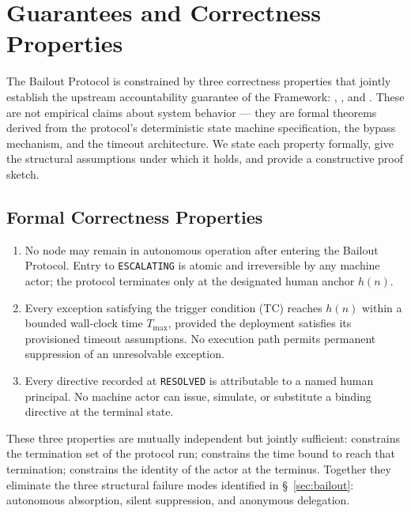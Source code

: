 \section{Guarantees and Correctness Properties}\label{sec:properties}

The Bailout Protocol is constrained by three correctness properties that jointly establish the upstream accountability guarantee of the \bxthree{} Framework: \SAFETY{}, \LIVENESS{}, and \ACCOUNTABILITY{}. These are not empirical claims about system behavior — they are formal theorems derived from the protocol's deterministic state machine specification, the bypass mechanism, and the timeout architecture. We state each property formally, give the structural assumptions under which it holds, and provide a constructive proof sketch.

\subsection{Formal Correctness Properties}

\begin{enumerate}
\item[\textbf{SAFETY.}] No \bxthree{} node may remain in autonomous operation after entering the Bailout Protocol. Entry to \texttt{ESCALATING} is atomic and irreversible by any machine actor; the protocol terminates only at the designated human anchor $h(n)$.

\item[\textbf{LIVENESS.}]\relax Every exception satisfying the trigger condition (TC) reaches $h(n)$ within a bounded wall-clock time $T_{\max}$, provided the deployment satisfies its provisioned timeout assumptions. No execution path permits permanent suppression of an unresolvable exception.

\item[\textbf{ACCOUNTABILITY.}]\relax Every directive recorded at \texttt{RESOLVED} is attributable to a named human principal. No machine actor can issue, simulate, or substitute a binding directive at the terminal state.
\end{enumerate}

These three properties are mutually independent but jointly sufficient: \SAFETY{} constrains the termination set of the protocol run; \LIVENESS{} constrains the time bound to reach that termination; \ACCOUNTABILITY{} constrains the identity of the actor at the terminus. Together they eliminate the three structural failure modes identified in \S~\ref{sec:bailout}: autonomous absorption, silent suppression, and anonymous delegation.

